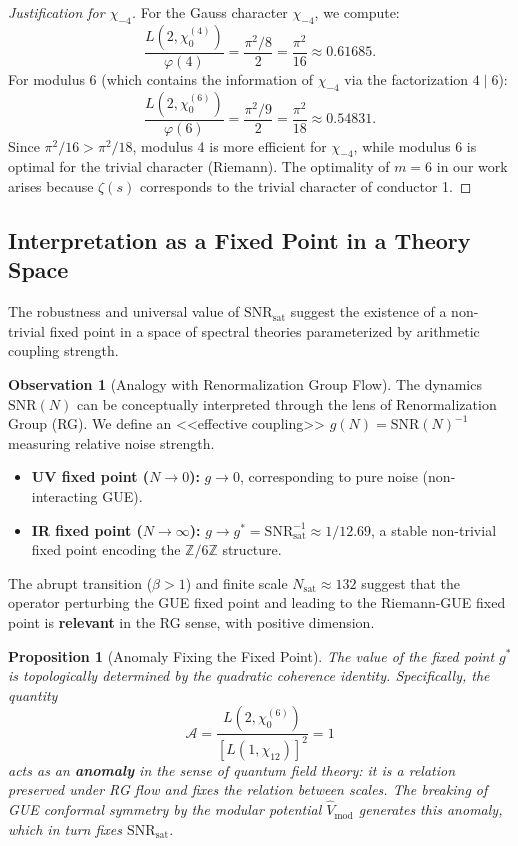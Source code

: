 \documentclass[12pt, a4paper]{article}
\theoremstyle{plain}
\newtheorem{proposicion}[teorema]{Proposition}
\theoremstyle{definition}
\newtheorem{observacion}[teorema]{Observation}
\theoremstyle{remark}
\begin{document}
\begin{proof}[Justification for $\chi_{-4}$]
For the Gauss character $\chi_{-4}$, we compute:
\[
\frac{L(2, \chi_0^{(4)})}{\varphi(4)} = \frac{\pi^2/8}{2} = \frac{\pi^2}{16} \approx 0.61685.
\]
For modulus 6 (which contains the information of $\chi_{-4}$ via the factorization $4 \mid 6$):
\[
\frac{L(2, \chi_0^{(6)})}{\varphi(6)} = \frac{\pi^2/9}{2} = \frac{\pi^2}{18} \approx 0.54831.
\]
Since $\pi^2/16 > \pi^2/18$, modulus 4 is more efficient for $\chi_{-4}$, while modulus 6 is optimal for the trivial character (Riemann). The optimality of $m=6$ in our work arises because $\zeta(s)$ corresponds to the trivial character of conductor 1.
\end{proof}

\subsection{Interpretation as a Fixed Point in a Theory Space}
\label{ap:qft}

The robustness and universal value of $\mathrm{SNR}_{\mathrm{sat}}$ suggest the existence of a non-trivial fixed point in a space of spectral theories parameterized by arithmetic coupling strength.

\begin{observacion}[Analogy with Renormalization Group Flow]
The dynamics $\mathrm{SNR}(N)$ can be conceptually interpreted through the lens of Renormalization Group (RG). We define an <<effective coupling>> $g(N) = \mathrm{SNR}(N)^{-1}$ measuring relative noise strength.
\begin{itemize}
    \item \textbf{UV fixed point ($N \to 0$):} $g \to 0$, corresponding to pure noise (non-interacting GUE).
    \item \textbf{IR fixed point ($N \to \infty$):} $g \to g^* = \mathrm{SNR}_{\text{sat}}^{-1} \approx 1/12.69$, a stable non-trivial fixed point encoding the $\mathbb{Z}/6\mathbb{Z}$ structure.
\end{itemize}
The abrupt transition ($\beta > 1$) and finite scale $N_{\text{sat}} \approx 132$ suggest that the operator perturbing the GUE fixed point and leading to the Riemann-GUE fixed point is \textbf{relevant} in the RG sense, with positive dimension.
\end{observacion}

\begin{proposicion}[Anomaly Fixing the Fixed Point]
The value of the fixed point $g^*$ is topologically determined by the quadratic coherence identity. Specifically, the quantity
\[
\mathcal{A} = \frac{L(2, \chi_0^{(6)})}{[L(1, \chi_{12})]^2} = 1
\]
acts as an \textbf{anomaly} in the sense of quantum field theory: it is a relation preserved under RG flow and fixes the relation between scales. The breaking of GUE conformal symmetry by the modular potential $\hat{V}_{\text{mod}}$ generates this anomaly, which in turn fixes $\mathrm{SNR}_{\mathrm{sat}}$.
\end{proposicion}
\end{document}
